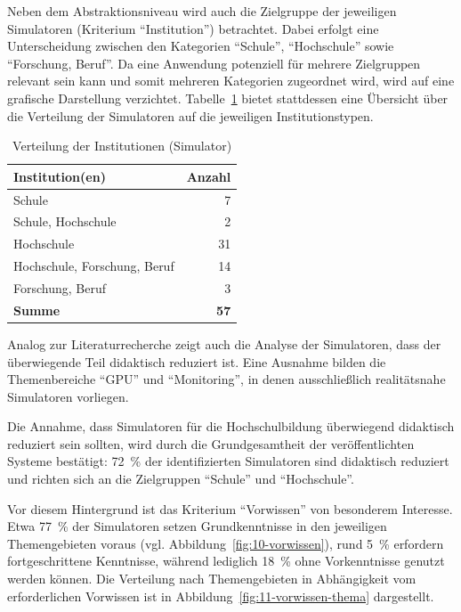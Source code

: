 Neben dem Abstraktionsniveau wird auch die Zielgruppe der jeweiligen Simulatoren (Kriterium \enquote{Institution}) betrachtet. Dabei erfolgt eine Unterscheidung zwischen den Kategorien \enquote{Schule}, \enquote{Hochschule} sowie \enquote{Forschung, Beruf}. Da eine Anwendung potenziell für mehrere Zielgruppen relevant sein kann und somit mehreren Kategorien zugeordnet wird, wird auf eine grafische Darstellung verzichtet. Tabelle~\ref{tab:institutionen} bietet stattdessen eine Übersicht über die Verteilung der Simulatoren auf die jeweiligen Institutionstypen.

\begin{table}[h]
	\centering
	\caption{Verteilung der Institutionen (Simulator)}
	\label{tab:institutionen}
	\begin{tabular}{l r}
		\toprule
		\textbf{Institution(en)} & \textbf{Anzahl} \\
		\midrule
		Schule                        & 7  \\
		Schule, Hochschule            & 2  \\
		Hochschule                    & 31 \\
		Hochschule, Forschung, Beruf  & 14 \\
		Forschung, Beruf              & 3  \\
        \hline
        \textbf{Summe}                & \textbf{57} \\
		\bottomrule
	\end{tabular}
\end{table}

Analog zur Literaturrecherche zeigt auch die Analyse der Simulatoren, dass der überwiegende Teil didaktisch reduziert ist. Eine Ausnahme bilden die Themenbereiche \enquote{GPU} und \enquote{Monitoring}, in denen ausschließlich realitätsnahe Simulatoren vorliegen.

Die Annahme, dass Simulatoren für die Hochschulbildung überwiegend didaktisch reduziert sein sollten, wird durch die Grundgesamtheit der veröffentlichten Systeme bestätigt: 72~\% der identifizierten Simulatoren sind didaktisch reduziert und richten sich an die Zielgruppen \enquote{Schule} und \enquote{Hochschule}.

Vor diesem Hintergrund ist das Kriterium \enquote{Vorwissen} von besonderem Interesse. Etwa 77~\% der Simulatoren setzen Grundkenntnisse in den jeweiligen Themengebieten voraus (vgl. Abbildung~\ref{fig:10-vorwissen}), rund 5~\% erfordern fortgeschrittene Kenntnisse, während lediglich 18~\% ohne Vorkenntnisse genutzt werden können. Die Verteilung nach Themengebieten in Abhängigkeit vom erforderlichen Vorwissen ist in Abbildung~\ref{fig:11-vorwissen-thema} dargestellt.

